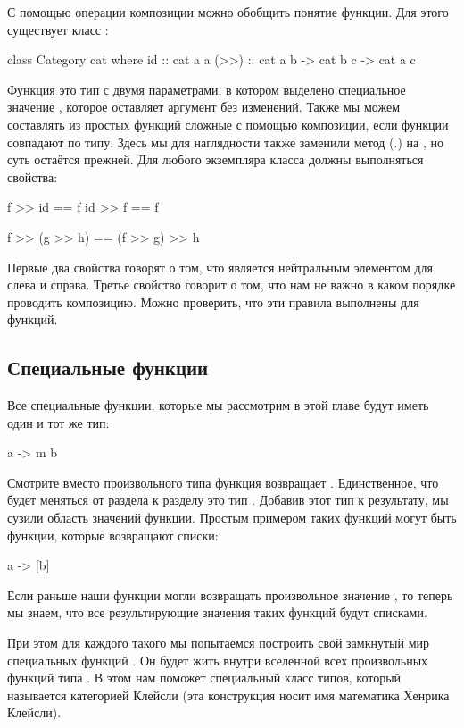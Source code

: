 С помощью операции композиции можно обобщить понятие 
функции. Для этого существует класс 
:

\begin{code}
class Category cat where
    id   :: cat a a
    (>>) :: cat a b -> cat b c -> cat a c
\end{code}

Функция  это тип с двумя параметрами, в котором выделено
специальное значение , которое оставляет
аргумент без изменений. Также мы можем составлять
из простых функций сложные с помощью композиции,
если функции совпадают по типу.
Здесь мы для наглядности также заменили метод \In(.) на
\In{(>>)}, но суть остаётся прежней. 
Для любого экземпляра класса должны выполняться 
свойства:

\begin{code}
f  >> id  == f
id >> f   == f

f >> (g >> h) == (f >> g) >> h
\end{code}

Первые два свойства говорят о том, что  является
нейтральным элементом для \In{(>>)} слева и справа. 
Третье свойство говорит о том, что нам не важно в каком
порядке проводить композицию. Можно проверить, что эти
правила выполнены для функций.

\subsection{Специальные функции}

Все специальные функции, которые мы рассмотрим в этой главе
будут иметь один и тот же тип:

\begin{code}
a -> m b
\end{code}

Смотрите вместо произвольного типа  функция
возвращает . Единственное, что будет меняться
от раздела к разделу это тип . Добавив этот тип
к результату, мы сузили область значений функции.
Простым примером таких функций могут быть функции, которые
возвращают списки:


\begin{code}
a -> [b]
\end{code}

Если раньше наши функции могли возвращать произвольное значение ,
то теперь мы знаем, что все результирующие значения таких функций 
будут списками.

При этом для каждого такого  мы попытаемся
построить свой замкнутый мир специальных функций . 
Он будет жить внутри  вселенной всех произвольных функций 
типа . В этом нам поможет специальный класс типов,
который называется категорией Клейсли (эта конструкция носит имя 
математика Хенрика Клейсли). 

